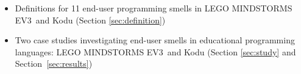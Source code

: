 \documentclass[conference]{IEEEtran}
\newcommand{\ms}{LEGO MINDSTORMS EV3}
\newcommand{\todo}[1]{\textbf{#1}}
\begin{document}
\begin{itemize} \itemsep -0.25pt
	\item Definitions for 11 end-user programming smells in \ms~and Kodu  (Section \ref{sec:definition})
	\item Two case studies investigating end-user smells in educational programming languages: \ms~and Kodu   (Section \ref{sec:study} and Section~\ref{sec:results})
\end{itemize}


\end{document}
